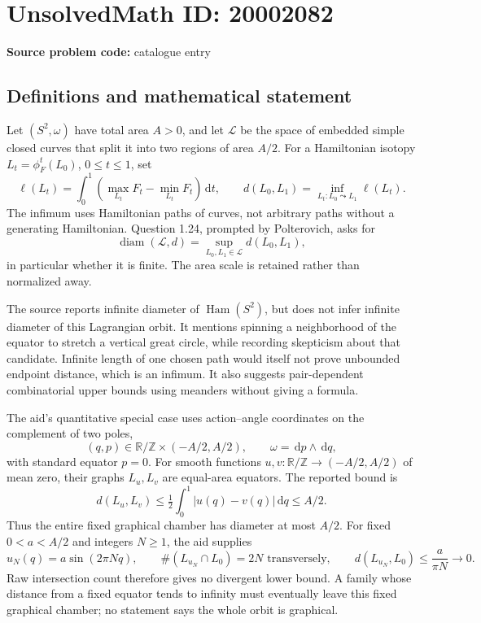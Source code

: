\documentclass[11pt]{article}
\newcommand{\Z}{\mathbb{Z}}
\newcommand{\R}{\mathbb{R}}
\newcommand{\dd}{\,\mathrm{d}}
\begin{document}
\section*{UnsolvedMath ID: 20002082}
\textbf{Source problem code:} catalogue entry
\subsection{Definitions and mathematical statement}
Let \((S^2,\omega)\) have total area \(A>0\), and let \(\mathcal L\) be the space of embedded simple closed curves that split it into two regions of area \(A/2\). For a Hamiltonian isotopy \(L_t=\phi_F^t(L_0)\), \(0\le t\le1\), set
\[
 \ell(L_t)=\int_0^1\left(\max_{L_t}F_t-\min_{L_t}F_t\right)\dd t,
 \qquad
 d(L_0,L_1)=\inf_{L_t:L_0\leadsto L_1}\ell(L_t).
\]
The infimum uses Hamiltonian paths of curves, not arbitrary paths without a generating Hamiltonian. Question 1.24, prompted by Polterovich, asks for
\[
 \operatorname{diam}(\mathcal L,d)=\sup_{L_0,L_1\in\mathcal L}d(L_0,L_1),
\]
in particular whether it is finite. The area scale is retained rather than normalized away.

The source reports infinite diameter of \(\operatorname{Ham}(S^2)\), but does not infer infinite diameter of this Lagrangian orbit. It mentions spinning a neighborhood of the equator to stretch a vertical great circle, while recording skepticism about that candidate. Infinite length of one chosen path would itself not prove unbounded endpoint distance, which is an infimum. It also suggests pair-dependent combinatorial upper bounds using meanders without giving a formula.

The aid's quantitative special case uses action--angle coordinates on the complement of two poles,
\[
 (q,p)\in\R/\Z\times(-A/2,A/2),\qquad \omega=\dd p\wedge\dd q,
\]
with standard equator \(p=0\). For smooth functions \(u,v:\R/\Z\to(-A/2,A/2)\) of mean zero, their graphs \(L_u,L_v\) are equal-area equators. The reported bound is
\[
 d(L_u,L_v)\le\tfrac12\int_0^1|u(q)-v(q)|\dd q\le A/2.
\]
Thus the entire fixed graphical chamber has diameter at most \(A/2\). For fixed \(0<a<A/2\) and integers \(N\ge1\), the aid supplies
\[
 u_N(q)=a\sin(2\pi Nq),\qquad
 \#(L_{u_N}\cap L_0)=2N\text{ transversely},\qquad
 d(L_{u_N},L_0)\le\frac{a}{\pi N}\longrightarrow0.
\]
Raw intersection count therefore gives no divergent lower bound. A family whose distance from a fixed equator tends to infinity must eventually leave this fixed graphical chamber; no statement says the whole orbit is graphical.
\end{document}
